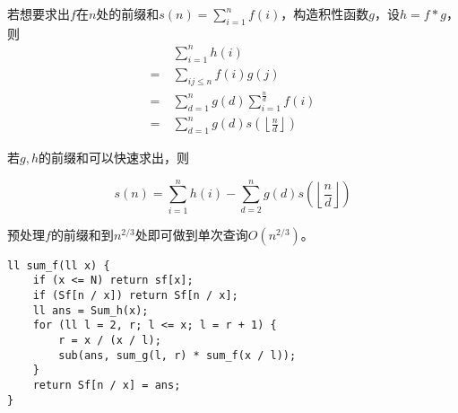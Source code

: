 若想要求出$f$在$n$处的前缀和$s(n) = \sum\limits_{i=1}^n f(i)$，构造积性函数$g$，设$h =  f \ast g$，则
$$
\begin{aligned}
& \sum\limits_{i = 1} ^ n h(i) \\
= \ & \sum\limits_{ij \leq n} f(i) g(j) \\
= \ & \sum\limits_{d = 1} ^ n g(d) \sum\limits_{i = 1} ^ {\frac n d} f(i) \\ 
= \ & \sum\limits_{d = 1} ^ n g(d) s\left(\left\lfloor\frac n d\right\rfloor\right)
\end{aligned}
$$

若$g,h$的前缀和可以快速求出，则

$$
s(n) = \sum\limits_{i = 1} ^ n h(i) - \sum\limits_{d = 2} ^ n g(d)s\left(\left\lfloor\frac n d\right\rfloor\right)
$$

预处理$f$的前缀和到$n^{2/3}$处即可做到单次查询$O(n^{2/3})$。

\begin{lstlisting}
ll sum_f(ll x) {
	if (x <= N) return sf[x];
	if (Sf[n / x]) return Sf[n / x];
	ll ans = Sum_h(x);
	for (ll l = 2, r; l <= x; l = r + 1) {
		r = x / (x / l);
		sub(ans, sum_g(l, r) * sum_f(x / l));
	}
	return Sf[n / x] = ans;
}
\end{lstlisting}
